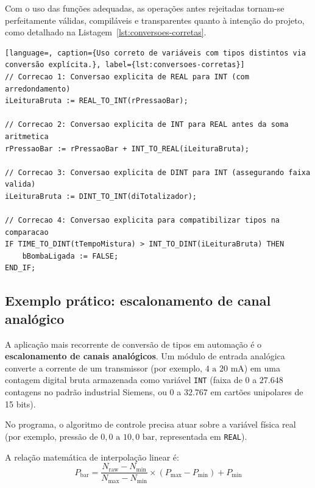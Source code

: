 
Com o uso das funções adequadas, as operações antes rejeitadas tornam-se perfeitamente válidas,
compiláveis e transparentes quanto à intenção do projeto, como detalhado na
Listagem~\ref{lst:conversoes-corretas}.

\begin{lstlisting}[language=, caption={Uso correto de variáveis com tipos distintos via conversão explícita.}, label={lst:conversoes-corretas}]
// Correcao 1: Conversao explicita de REAL para INT (com arredondamento)
iLeituraBruta := REAL_TO_INT(rPressaoBar);

// Correcao 2: Conversao explicita de INT para REAL antes da soma aritmetica
rPressaoBar := rPressaoBar + INT_TO_REAL(iLeituraBruta);

// Correcao 3: Conversao explicita de DINT para INT (assegurando faixa valida)
iLeituraBruta := DINT_TO_INT(diTotalizador);

// Correcao 4: Conversao explicita para compatibilizar tipos na comparacao
IF TIME_TO_DINT(tTempoMistura) > INT_TO_DINT(iLeituraBruta) THEN
    bBombaLigada := FALSE;
END_IF;
\end{lstlisting}

\subsection{Exemplo prático: escalonamento de canal analógico}

A aplicação mais recorrente de conversão de tipos em automação é o \textbf{escalonamento de canais
analógicos}. Um módulo de entrada analógica converte a corrente de um transmissor (por exemplo,
$4\text{ a }20\text{ mA}$) em uma contagem digital bruta armazenada como variável \texttt{INT}
(faixa de $0$ a $27.648$ contagens no padrão industrial Siemens, ou $0$ a $32.767$ em cartões
unipolares de 15 bits).

No programa, o algoritmo de controle precisa atuar sobre a variável física real (por exemplo,
pressão de $0,0\text{ a }10,0\text{ bar}$, representada em \texttt{REAL}).

A relação matemática de interpolação linear é:
\begin{equation}
  P_{\text{bar}} = \frac{N_{\text{raw}} - N_{\text{min}}}{N_{\text{max}} - N_{\text{min}}}
  \times (P_{\text{max}} - P_{\text{min}}) + P_{\text{min}}
  \label{eq:escalonamento-linear}
\end{equation}

